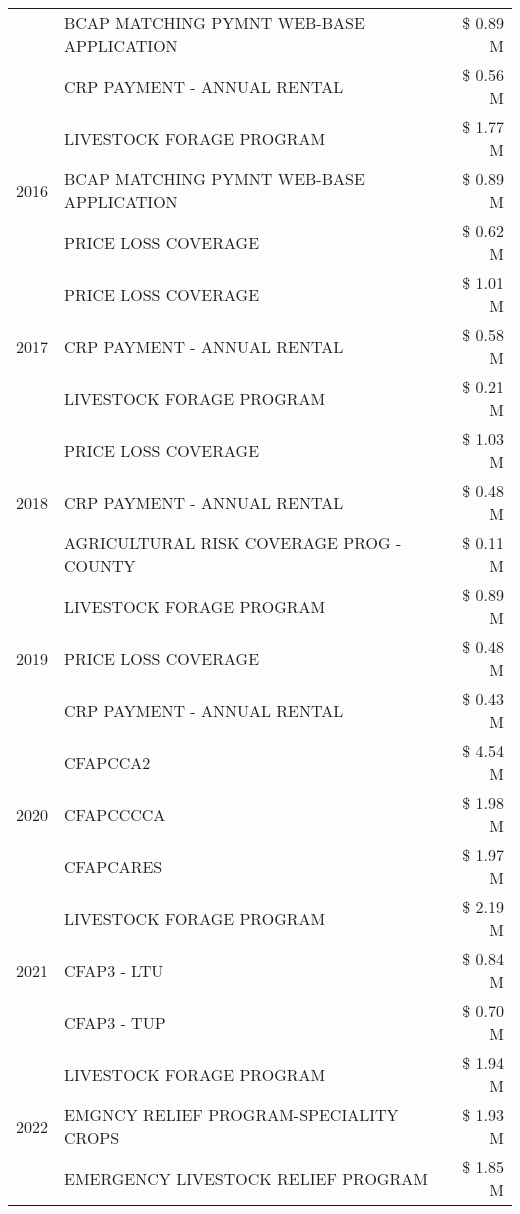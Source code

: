 \begin{tabular}{llr}
 & BCAP MATCHING PYMNT WEB-BASE APPLICATION & \$ 0.89 M \\
 & CRP PAYMENT - ANNUAL RENTAL & \$ 0.56 M \\
\cline{1-3}
\multirow[t]{3}{*}{2016} & LIVESTOCK FORAGE PROGRAM & \$ 1.77 M \\
 & BCAP MATCHING PYMNT WEB-BASE APPLICATION & \$ 0.89 M \\
 & PRICE LOSS COVERAGE & \$ 0.62 M \\
\cline{1-3}
\multirow[t]{3}{*}{2017} & PRICE LOSS COVERAGE & \$ 1.01 M \\
 & CRP PAYMENT - ANNUAL RENTAL & \$ 0.58 M \\
 & LIVESTOCK FORAGE PROGRAM & \$ 0.21 M \\
\cline{1-3}
\multirow[t]{3}{*}{2018} & PRICE LOSS COVERAGE & \$ 1.03 M \\
 & CRP PAYMENT - ANNUAL RENTAL & \$ 0.48 M \\
 & AGRICULTURAL RISK COVERAGE PROG - COUNTY & \$ 0.11 M \\
\cline{1-3}
\multirow[t]{3}{*}{2019} & LIVESTOCK FORAGE PROGRAM & \$ 0.89 M \\
 & PRICE LOSS COVERAGE & \$ 0.48 M \\
 & CRP PAYMENT - ANNUAL RENTAL & \$ 0.43 M \\
\cline{1-3}
\multirow[t]{3}{*}{2020} & CFAPCCA2 & \$ 4.54 M \\
 & CFAPCCCCA & \$ 1.98 M \\
 & CFAPCARES & \$ 1.97 M \\
\cline{1-3}
\multirow[t]{3}{*}{2021} & LIVESTOCK FORAGE PROGRAM & \$ 2.19 M \\
 & CFAP3 - LTU & \$ 0.84 M \\
 & CFAP3 - TUP & \$ 0.70 M \\
\cline{1-3}
\multirow[t]{3}{*}{2022} & LIVESTOCK FORAGE PROGRAM & \$ 1.94 M \\
 & EMGNCY RELIEF PROGRAM-SPECIALITY CROPS & \$ 1.93 M \\
 & EMERGENCY LIVESTOCK RELIEF PROGRAM & \$ 1.85 M \\
\cline{1-3}
\bottomrule
\end{tabular}
